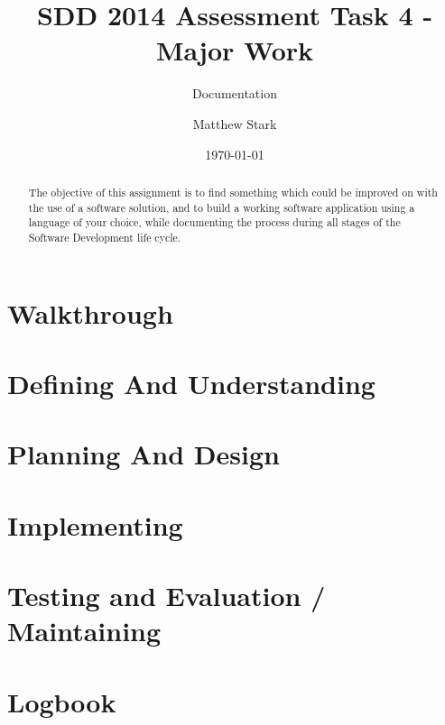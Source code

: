 \documentclass[notitlepage]{report}
\title{SDD 2014 Assessment Task 4 - Major Work}
\subtitle{Documentation}
\author{Matthew Stark}
\date{\today}
\begin{document}
\maketitle
\begin{abstract}
    The objective of this assignment is to find something which could be improved on with the use of a software solution, and to build a working software application using a language of your choice, while documenting the process during all stages of the Software Development life cycle.
    
\end{abstract}

\vspace*{\fill}
\tableofcontents
\newpage

\section{Walkthrough}






\newpage

\section{Defining And Understanding}





\newpage

\section{Planning And Design}





\newpage

\section{Implementing}
\newpage

\section{Testing and Evaluation / Maintaining}




\newpage

\section{Logbook}

\newpage

\nocite{*}

\end{document}
